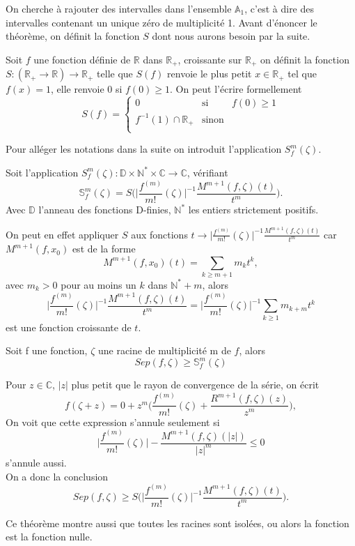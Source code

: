 \documentclass[a4paper,10.5pt]{article}
\begin{document}
	\noindent On cherche à rajouter des intervalles dans l'ensemble $\mathbb{A}_1$, c'est à dire des intervalles contenant un unique zéro de multiplicité 1.
	Avant d'énoncer le théorème, on définit la fonction $S$ dont nous aurons besoin par la suite. 
	\begin{definition} Soit $f$ une fonction définie de $\mathbb{R}$ dans $\mathbb{R}_+$, croissante sur $\mathbb{R}_+$ on définit la fonction $S:(\mathbb{R}_+ \rightarrow \mathbb{R}) \longrightarrow \mathbb{R}_+$  telle que $S(f)$ renvoie le plus petit $x \in \mathbb{R}_+$ tel que $f(x)=1$, elle renvoie 0 si $f(0) \geq1$. On  peut l'écrire formellement
		\begin{equation}
		S(f)=
		\left\lbrace
		\begin{array}{ccc}
		0  & \mbox{si} & f(0) \geq 1\\
		f^{-1}(1)\cap \mathbb{R}_{+} & \mbox{sinon}\\
		\end{array}\right.
		\end{equation}
	\end{definition}
	\vspace{7mm}
	Pour alléger les notations dans la suite on introduit l'application $S_{f}^{m}(\zeta)$.
	\begin{definition}
		Soit l'application $S_{f}^{m}(\zeta) : \mathbb{D}\times \mathbb{N}^* \times \mathbb{C} \rightarrow \mathbb{C}$, vérifiant
		\[\mathbb{S}_{f}^{m}(\zeta)=S\big(\Big|\frac{f^{(m)}}{m!}(\zeta)\Big|^{-1}\frac{M^{m+1}(f,\zeta)(t)}{t^{m}}\big).\]
		Avec $\mathbb{D}$ l'anneau des fonctions D-finies, $\mathbb{N}^{*}$ les entiers strictement positifs.
	\end{definition}
	\vspace{7mm}
	\noindent On peut en effet appliquer $S$ aux fonctions $t \rightarrow \Big|\frac{f^{(m)}}{m!}(\zeta)\Big|^{-1}\frac{M^{m+1}(f,\zeta)(t)}{t^{m}}$ car $M^{m+1}(f,x_0)$ est de la forme
	\[M^{m+1}(f,x_0)(t)=\sum_{k \geq m+1} m_k t^k,\]
	avec $m_k >0$ pour au moins un $k$ dans $\mathbb{N}^{*}+m$, alors
	\[\Big|\frac{f^{(m)}}{m!}(\zeta)\Big|^{-1}\frac{M^{m+1}(f,\zeta)(t)}{t^{m}}=\Big|\frac{f^{(m)}}{m!}(\zeta)\Big|^{-1}\sum_{k \geq 1} m_{k+m} t^k\]
	est une fonction croissante de $t$.
	\vspace{7mm}

	\begin{theorem}
			Soit f une fonction, $\zeta$ une racine de multiplicité m de $f$, alors
		\[Sep(f,\zeta) \geq \mathbb{S}_{f}^{m}(\zeta)\]
	\end{theorem}
	\begin{demonstration}
		Pour $z \in \mathbb{C}$, $|z|$ plus petit que le rayon de convergence de la série, on écrit 
		\[f(\zeta +z)=0+z^m\Big(\frac{f^{(m)}}{m!}(\zeta)+\frac{R^{m+1}(f,\zeta)(z)}{z^m}\Big),\]
		On voit que cette expression s'annule seulement si
		\[\Big|\frac{f^{(m)}}{m!}(\zeta)\Big|-\frac{M^{m+1}(f,\zeta)(|z|)}{|z|^m}\leq 0\]
		s'annule aussi.\\
		On a donc la conclusion
		\[Sep(f,\zeta) \geq S\big(\Big|\frac{f^{(m)}}{m!}(\zeta)\Big|^{-1}\frac{M^{m+1}(f,\zeta)(t)}{t^{m}}\big).\]
	\end{demonstration}
	Ce théorème montre aussi que toutes les racines sont isolées, ou alors la fonction est la fonction nulle.
\end{document}
